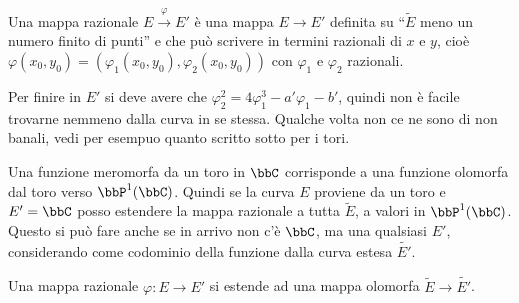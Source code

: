 \begin{definizione}
	Una mappa razionale $E \overset{\varphi}{\rightarrow} E'$ è una mappa $E\rightarrow E'$ definita su ``$\tilde{E}$ meno un numero finito di punti'' e che può scrivere in termini razionali di $x$ e $y$, cioè $\varphi(x_0,y_0) = (\varphi_1(x_0,y_0),\varphi_2(x_0,y_0) )$ con $\varphi_1$ e $\varphi_2$ razionali.
\end{definizione}

\begin{osservazione}
Per finire in $E'$ si deve avere che $\varphi_2^2=4\varphi_1^3-a'\varphi_1-b'$, quindi non è facile trovarne nemmeno dalla curva in se stessa. Qualche volta non ce ne sono di non banali, vedi per esempuo quanto scritto sotto per i tori.
\end{osservazione}

Una funzione meromorfa da un toro in $\bbC$ corrisponde a una funzione olomorfa dal toro verso $\bbP^1(\bbC)$.
Quindi se la curva $E$ proviene da un toro e $E'=\bbC$ posso estendere la mappa razionale a tutta $\tilde{E}$, a valori in $\bbP^1(\bbC)$.
Questo si può fare anche se in arrivo non c'è $\bbC$, ma una qualsiasi $E'$, considerando come codominio della funzione dalla curva estesa $\tilde{E'}$.

\begin{proposizione}
Una mappa razionale $\varphi: E\rightarrow E'$ si estende ad una mappa olomorfa $\tilde{E} \rightarrow \tilde {E'}$.
\end{proposizione}

